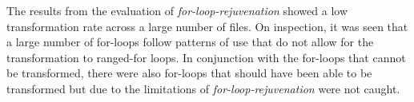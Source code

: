 \documentclass[bsc,frontabs,singlespacing,twoside,parskip,deptreport]{infthesis}
\begin{document}
The results from the evaluation of \textit{for-loop-rejuvenation} showed a low transformation rate across a large number of files. On inspection, it was seen that a large number of for-loops follow patterns of use that do not allow for the transformation to ranged-for loops. In conjunction with the for-loops that cannot be transformed, there were also for-loops that should have been able to be transformed but due to the limitations of \textit{for-loop-rejuvenation} were not caught.



    
\end{document}
